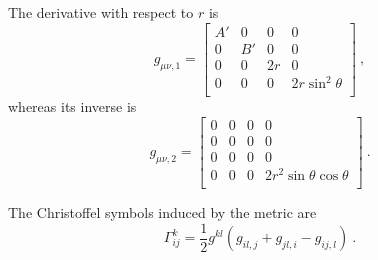     The derivative with respect to $r$ is 
    \begin{equation*}
        g_{\mu\nu, 1} = \begin{bmatrix}
            A' & 0 & 0 & 0 \\
            0 & B' & 0 & 0 \\
            0 & 0 & 2 r & 0 \\
            0 & 0 & 0 & 2 r \sin^2 \theta \\
        \end{bmatrix} ~,
    \end{equation*}
    whereas its inverse is 
    \begin{equation*}
        g_{\mu\nu, 2} = \begin{bmatrix}
            0 & 0 & 0 & 0 \\
            0 & 0 & 0 & 0 \\
            0 & 0 & 0 & 0 \\
            0 & 0 & 0 & 2 r^2 \sin \theta \cos \theta \\
        \end{bmatrix} ~.
    \end{equation*}

    The Christoffel symbols induced by the metric are
    \begin{equation*}
        \Gamma^k_{ij} = \frac{1}{2} g^{kl} (g_{il,j} + g_{jl,i} - g_{ij,l}) ~.
    \end{equation*}

